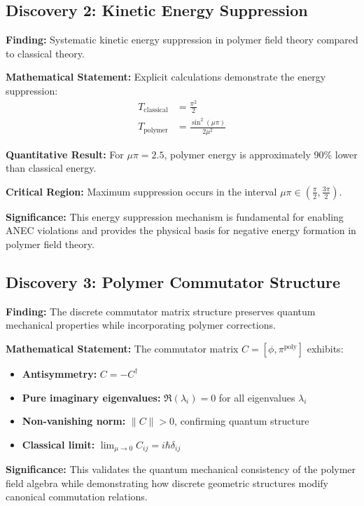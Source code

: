 \documentclass[11pt]{article}
\begin{document}
\subsection{Discovery 2: Kinetic Energy Suppression}

\textbf{Finding:} Systematic kinetic energy suppression in polymer field theory compared to classical theory.

\textbf{Mathematical Statement:}
Explicit calculations demonstrate the energy suppression:
\begin{align}
T_{\text{classical}} &= \frac{\pi^2}{2} \\
T_{\text{polymer}} &= \frac{\sin^2(\mu\pi)}{2\mu^2}
\end{align}

\textbf{Quantitative Result:} For $\mu\pi = 2.5$, polymer energy is approximately 90\% lower than classical energy.

\textbf{Critical Region:} Maximum suppression occurs in the interval $\mu\pi \in \left(\frac{\pi}{2}, \frac{3\pi}{2}\right)$.

\textbf{Significance:} This energy suppression mechanism is fundamental for enabling ANEC violations and provides the physical basis for negative energy formation in polymer field theory.

\subsection{Discovery 3: Polymer Commutator Structure}

\textbf{Finding:} The discrete commutator matrix structure preserves quantum mechanical properties while incorporating polymer corrections.

\textbf{Mathematical Statement:}
The commutator matrix $C = [\phi, \pi^{\text{poly}}]$ exhibits:
\begin{itemize}
    \item \textbf{Antisymmetry:} $C = -C^\dagger$
    \item \textbf{Pure imaginary eigenvalues:} $\Re(\lambda_i) = 0$ for all eigenvalues $\lambda_i$
    \item \textbf{Non-vanishing norm:} $\|C\| > 0$, confirming quantum structure
    \item \textbf{Classical limit:} $\lim_{\mu \to 0} C_{ij} = i\hbar\delta_{ij}$
\end{itemize}

\textbf{Significance:} This validates the quantum mechanical consistency of the polymer field algebra while demonstrating how discrete geometric structures modify canonical commutation relations.
\end{document}
